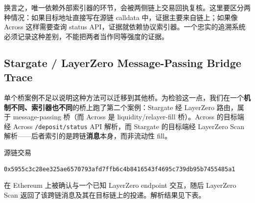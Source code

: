 \documentclass[12pt,a4paper]{ctexart}
\begin{document}
换言之，唯一依赖外部索引器的环节，会被两侧链上交易回执复核。这里要区分两种情况：如果目标地址直接写在源链 calldata 中，证据主要来自链上；如果像 Across 这样需要查询 status API，证据就依赖协议索引器。一个忠实的追溯系统必须记录这种差别，不能把两者当作同等强度的证据。

\hypertarget{stargate-layerzero-message-passing-bridge-trace}{%
\subsection{Stargate / LayerZero Message-Passing Bridge
Trace}\label{stargate-layerzero-message-passing-bridge-trace}}

单个桥案例不足以说明这种方法可以迁移到其他桥。为检验这一点，我们在一个\textbf{机制不同、索引器也不同}的桥上跑了第二个案例：Stargate
经 LayerZero 路由，属于 message-passing 桥（而 Across 是
liquidity/relayer-fill 桥）。Across 的目标端经 Across
\texttt{/deposit/status} API 解析，而 Stargate 的目标端经 LayerZero Scan
解析------后者索引的是跨链\textbf{消息}本身，而非流动性 fill。

源链交易

\begin{verbatim}
0x5955c3c28ee325ae6570793afd7ffb6c4b8416543f4695c739db95b7455485a1
\end{verbatim}

在 Ethereum 上被确认与一个已知 LayerZero endpoint 交互，随后 LayerZero
Scan 返回了该跨链消息及其在目标链上的投递。解析结果见下表。
\end{document}
